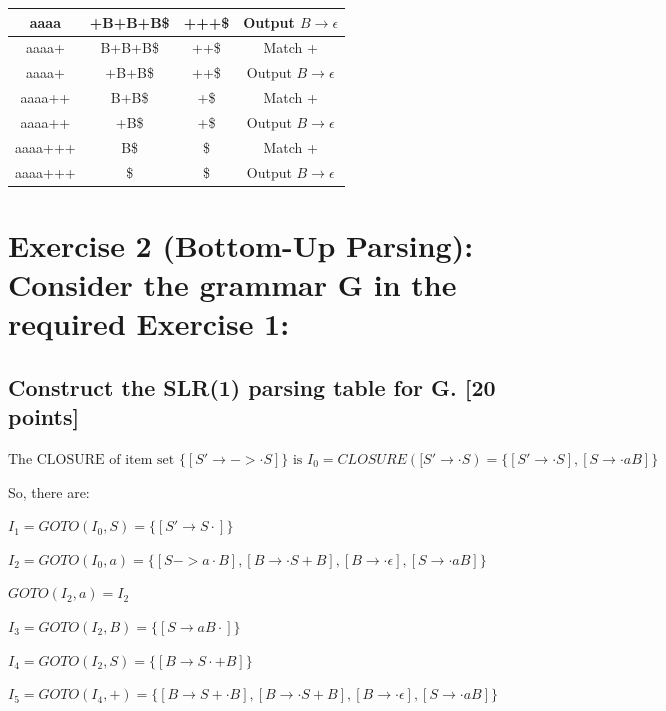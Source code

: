 \documentclass{article}
\begin{document}
\begin{table}[H]
\begin{tabular}{|c|c|c|c|}
                    \hline
                    aaaa    & +B+B+B\$    & +++\$       & Output $B\rightarrow\epsilon$ \\
                    \hline
                    aaaa+   & B+B+B\$     & ++\$        & Match +                       \\
                    \hline
                    aaaa+   & +B+B\$      & ++\$        & Output $B\rightarrow\epsilon$ \\
                    \hline
                    aaaa++  & B+B\$       & +\$         & Match +                       \\
                    \hline
                    aaaa++  & +B\$        & +\$         & Output $B\rightarrow\epsilon$ \\
                    \hline
                    aaaa+++ & B\$         & \$          & Match +                       \\
                    \hline
                    aaaa+++ & \$          & \$          & Output $B\rightarrow\epsilon$ \\
                    \hline
            \end{tabular}
        \end{table}
    \section{Exercise 2 (Bottom-Up Parsing): Consider the grammar G in the required Exercise 1:}
        \subsection{Construct the SLR(1) parsing table for G. [20 points]}
        $\text{The CLOSURE of item set }\{[S'\rightarrow->\cdot S]\}\text{ is }
        I_0 =CLOSURE([S'\rightarrow\cdot S) = \{[S'\rightarrow\cdot S],[S\rightarrow\cdot aB]\}$
        
        So, there are:

        $I_1 = GOTO(I_0,S) = \{[S'\rightarrow S\cdot]\}$

        $I_2 = GOTO(I_0,a) = \{[S->a\cdot B],[B\rightarrow \cdot S+B],[B\rightarrow \cdot \epsilon], [S\rightarrow \cdot aB]\}$

        $GOTO(I_2,a)=I_2$

        $I_3 = GOTO(I_2, B) = \{[S\rightarrow aB\cdot]\}$

        $I_4 = GOTO(I_2,S) = \{[B\rightarrow S\cdot+B]\}$

        $I_5 = GOTO(I_4,+) = \{[B\rightarrow S+\cdot B],[B\rightarrow\cdot S+B],[B\rightarrow\cdot\epsilon],[S\rightarrow \cdot aB]\}$
        
\end{document}
